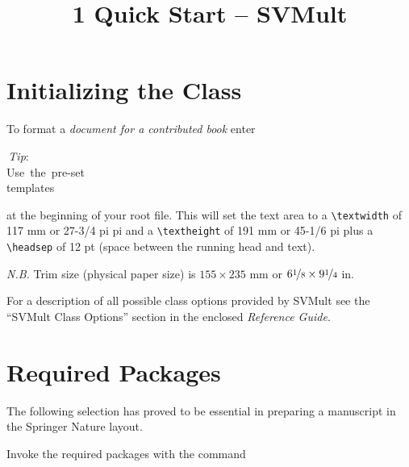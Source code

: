 \documentclass[graybox]{svmult}
\def\thechapter{\vspace*{-2pc}}
\begin{document}
\title{1 Quick Start -- SVMult}

\author{}

\maketitle

\begin{refguide}

\begin{sloppy}

\def\thechapter{\arabic{chapter}}

\vspace*{-13pc}


\section{Initializing the Class}

To format a {\it document for a contributed book} enter
\cprotect{}

\vspace*{-5pc}
\hspace*{28pc}\,{\it Tip}: \\
\hspace*{28pc} \hbox{Use the pre-set}\\
\hspace*{28pc} \hbox{templates}


\bigskip at the beginning of your root file. This will set the text area to a \verb|\textwidth| of 117 mm or 27-3/4 pi pi and a \verb|\textheight| of 191 mm or 45-1/6 pi plus a \verb|\headsep| of 12 pt (space between the running head and text).

{\it N.B.} Trim size (physical paper size) is $155 \times 235$ mm or $6\nicefrac{1}{8} \times 9\nicefrac{1}{4}$ in.

For a description of all possible class options provided by {\sc SVMult} see the ``{\sc SVMult} Class Options'' section in the enclosed {\it Reference Guide}.

\section{Required Packages}
The following selection has proved to be essential in preparing a manuscript in the Springer Nature layout.

Invoke the required packages with the command

\cprotect\boxtext{\verb|\usepackage{}|}


\end{sloppy}
\end{refguide}
\end{document}
